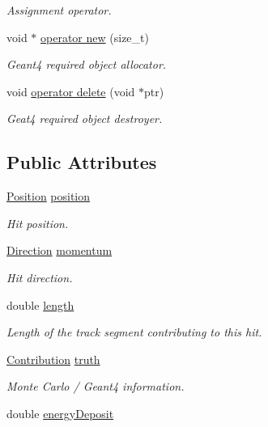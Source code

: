 \begin{DoxyCompactItemize}
\begin{DoxyCompactList}\small\item\em Assignment operator. \end{DoxyCompactList}\item 
void $\ast$ \hyperlink{class_d_d4hep_1_1_simulation_1_1_geant4_tracker_hit_a66a40ac322757dd8e5398a28dbd04334}{operator new} (size\+\_\+t)
\begin{DoxyCompactList}\small\item\em Geant4 required object allocator. \end{DoxyCompactList}\item 
void \hyperlink{class_d_d4hep_1_1_simulation_1_1_geant4_tracker_hit_a40caf2e6d8ebdf643bd26f27aff917b0}{operator delete} (void $\ast$ptr)
\begin{DoxyCompactList}\small\item\em Geat4 required object destroyer. \end{DoxyCompactList}\end{DoxyCompactItemize}
\subsection*{Public Attributes}
\begin{DoxyCompactItemize}
\item 
\hyperlink{namespace_d_d4hep_1_1_geometry_a55083902099d03506c6db01b80404900}{Position} \hyperlink{class_d_d4hep_1_1_simulation_1_1_geant4_tracker_hit_a76e77eb92142c6f794ac37b6471df512}{position}
\begin{DoxyCompactList}\small\item\em Hit position. \end{DoxyCompactList}\item 
\hyperlink{namespace_d_d4hep_1_1_geometry_a56730a0ddb9f3f089c415cd693bd7c19}{Direction} \hyperlink{class_d_d4hep_1_1_simulation_1_1_geant4_tracker_hit_a134e45be8162d17fc85e1a0c5f8b7e52}{momentum}
\begin{DoxyCompactList}\small\item\em Hit direction. \end{DoxyCompactList}\item 
double \hyperlink{class_d_d4hep_1_1_simulation_1_1_geant4_tracker_hit_a71b52bb59bc3f9a54d50c925f92027a5}{length}
\begin{DoxyCompactList}\small\item\em Length of the track segment contributing to this hit. \end{DoxyCompactList}\item 
\hyperlink{class_d_d4hep_1_1_simulation_1_1_geant4_hit_a03a5270c4d1410302fe278ce6a47f268}{Contribution} \hyperlink{class_d_d4hep_1_1_simulation_1_1_geant4_tracker_hit_a154bd6a86c7e962c8e6bb4b010318a45}{truth}
\begin{DoxyCompactList}\small\item\em Monte Carlo / Geant4 information. \end{DoxyCompactList}\item 
double \hyperlink{class_d_d4hep_1_1_simulation_1_1_geant4_tracker_hit_a0af1fbbb8d345344c088b8596b97998f}{energy\+Deposit}
\end{DoxyCompactItemize}
